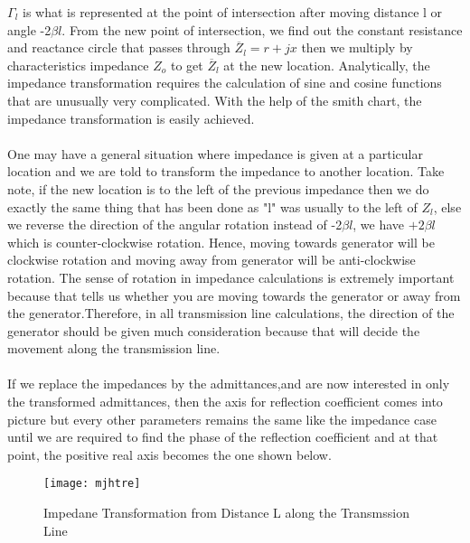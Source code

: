  $\Gamma_{l}$ is what is represented at the point of intersection after moving distance l or angle -2$\beta{l}$. From the new point of  intersection, we find out the constant resistance and reactance circle that passes through $\overline{Z}_{l} = r + jx$ then we multiply by characteristics impedance $Z_o$ to get $\overline{Z}_{l}$ at the new location. Analytically, the impedance transformation requires the calculation of sine and cosine functions that are unusually very complicated. With the help of the smith chart, the impedance transformation is easily achieved.\\\\
  One may have a general situation where impedance is given at a particular location and we are told to transform the impedance to another location. Take note, if the new location is to the left of the previous impedance then we do exactly the same thing that has been done as "l" was usually to the left of $Z_{l}$, else we reverse the direction of the angular rotation instead of -2$\beta{l}$, we have $+2\beta{l}$ which is counter-clockwise rotation. Hence, moving towards generator will be clockwise rotation and moving away from generator will be anti-clockwise rotation. The sense of rotation in impedance calculations is extremely important because that tells us whether you are moving towards the generator or away from the generator.Therefore, in all transmission line calculations, the direction of the generator should be given much consideration because that will decide the movement along the transmission line. \\\\
  If we replace the impedances by the admittances,and are now interested in only the transformed admittances, then the axis for reflection coefficient comes into picture but every other parameters remains the same like the impedance case until we are required to find the phase of the reflection coefficient and at that point, the positive real axis becomes the one shown below.
  \begin{figure}[h]
  	\centering
  	\texttt{[image: mjhtre]}
  	\caption{Impedane Transformation from Distance L along the Transmssion Line}
  	\label{fig:mjhtre}
  \end{figure}
 
